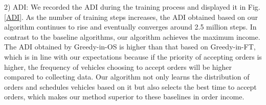 2) ADI: 
We recorded the ADI during the training process and displayed it in Fig. \ref{ADI}. As the number of training steps increases, the ADI obtained based on our algorithm continues to rise and eventually converges around 2.5 million steps. In contrast to the baseline algorithms, our algorithm achieves the maximum income. The ADI obtained by Greedy-in-OS is higher than that based on Greedy-in-FT, which is in line with our expectations because if the priority of accepting orders is higher, the frequency of vehicles choosing to accept orders will be higher compared to collecting data. Our algorithm not only learns the distribution of orders and schedules vehicles based on it but also selects the best time to accept orders, which makes our method superior to these baselines in order income.
\begin{table}[ht]
\centering
\caption{The average accuracy of different methods.
}

\label{tab:accuracy_methods}
\end{table}
